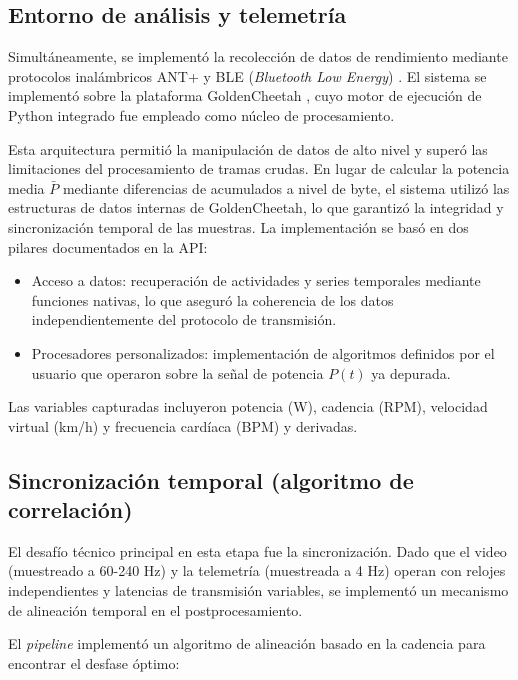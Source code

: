 \subsection{Entorno de análisis y telemetría}
\label{ssec:telemetria}
Simultáneamente, se implementó la recolección de datos de rendimiento mediante
protocolos inalámbricos ANT+ \citep{ANTPlus} y BLE (\textit{Bluetooth Low
  Energy}) \citep{Gomez2012BLE}. El sistema se implementó sobre la plataforma
GoldenCheetah \citep{goldencheetah_web}, cuyo motor de ejecución de Python
integrado fue empleado como núcleo de procesamiento.

Esta arquitectura permitió la manipulación de datos de alto nivel y superó las
limitaciones del procesamiento de tramas crudas. En lugar de calcular la
potencia media $\bar{P}$ mediante diferencias de acumulados a nivel de byte, el
sistema utilizó las estructuras de datos internas de GoldenCheetah, lo que
garantizó la integridad y sincronización temporal de las muestras. La
implementación se basó en dos pilares documentados en la API:

\begin{itemize}
  \item Acceso a datos: recuperación de actividades y series temporales mediante
        funciones nativas, lo que aseguró la coherencia de los datos independientemente
        del protocolo de transmisión.
  \item Procesadores personalizados: implementación de algoritmos definidos por el
        usuario que operaron sobre la señal de potencia $P(t)$ ya depurada.
\end{itemize}

Las variables capturadas incluyeron potencia (W), cadencia (RPM), velocidad
virtual (km/h) y frecuencia cardíaca (BPM) y derivadas.

\subsection{Sincronización temporal (algoritmo de correlación)}
\label{ssec:sync_temporal}
El desafío técnico principal en esta etapa fue la sincronización. Dado que el
video (muestreado a 60-240 Hz) y la telemetría (muestreada a 4 Hz) operan con
relojes independientes y latencias de transmisión variables, se implementó un
mecanismo de alineación temporal en el postprocesamiento.

El \textit{pipeline} implementó un algoritmo de alineación basado en la
cadencia para encontrar el desfase óptimo:

